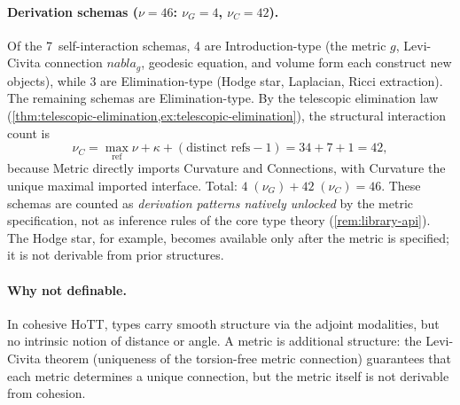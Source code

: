 \documentclass[11pt,a4paper]{article}
\def\nabla{nabla}%
\theoremstyle{plain}
\theoremstyle{definition}
\theoremstyle{remark}
\begin{document}
\paragraph{Derivation schemas ($\nu = 46$: $\nu_G = 4$, $\nu_C = 42$).}
Of the 7~self-interaction schemas, 4 are Introduction-type (the metric $g$, Levi-Civita connection $\nabla_g$, geodesic equation, and volume form each construct new objects), while 3 are Elimination-type (Hodge star, Laplacian, Ricci extraction).
The remaining schemas are Elimination-type.
By the telescopic elimination law (\cref{thm:telescopic-elimination,ex:telescopic-elimination}), the structural interaction count is
\[
  \nu_C
  =
  \max_{\mathrm{ref}} \nu + \kappa + (\text{distinct refs} - 1)
  =
  34 + 7 + 1
  =
  42,
\]
because Metric directly imports Curvature and Connections, with Curvature the unique maximal imported interface.
Total: $4\;(\nu_G) + 42\;(\nu_C) = 46$.
These schemas are counted as \emph{derivation patterns natively unlocked} by the metric specification, not as inference rules of the core type theory (\cref{rem:library-api}).
The Hodge star, for example, becomes available only after the metric is specified; it is not derivable from prior structures.

\paragraph{Why not definable.}
In cohesive HoTT, types carry smooth structure via the adjoint modalities, but no intrinsic notion of distance or angle.
A metric is additional structure: the Levi-Civita theorem (uniqueness of the torsion-free metric connection) guarantees that each metric determines a unique connection, but the metric itself is not derivable from cohesion.
\end{document}
